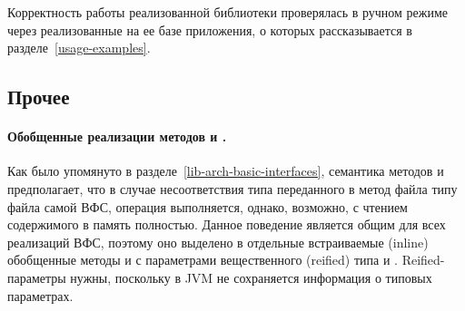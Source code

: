   Корректность работы реализованной библиотеки проверялась в ручном режиме через реализованные на ее базе приложения, о которых рассказывается в разделе~\ref{usage-examples}.

\subsection{Прочее}
  \paragraph{Обобщенные реализации методов  и .} Как было упомянуто в разделе~\ref{lib-arch-basic-interfaces}, семантика методов  и  предполагает, что в случае несоответствия типа переданного в метод файла типу файла самой ВФС, операция выполняется, однако, возможно, с чтением содержимого в память полностью. Данное поведение является общим для всех реализаций ВФС, поэтому оно выделено в отдельные встраиваемые (inline) обобщенные методы  и  с параметрами вещественного (reified) типа\cite{kotlin-reified}  и . Reified-параметры нужны, поскольку в JVM не сохраняется информация о типовых параметрах.


